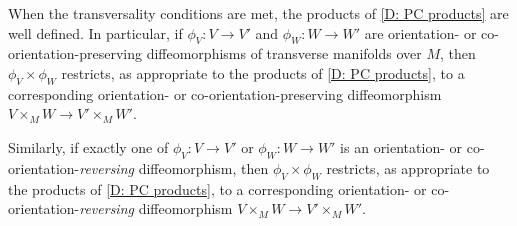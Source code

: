 \begin{lemma}\label{L: product preserves iso}
	When the transversality conditions are met, the products of \cref{D: PC products} are well defined.
	In particular, if $\phi_V \colon V \to V'$ and $\phi_W \colon W \to W'$ are orientation- or co-orientation-preserving diffeomorphisms of transverse manifolds over $M$, then $\phi_V \times \phi_W$ restricts, as appropriate to the products of \cref{D: PC products}, to a corresponding orientation- or co-orientation-preserving diffeomorphism $V \times_M W \to V' \times_M W'$.

	Similarly, if exactly one of $\phi_V \colon V \to V'$ or $\phi_W \colon W \to W'$ is an orientation- or co-orientation-\textit{reversing} diffeomorphism, then $\phi_V \times \phi_W$ restricts, as appropriate to the products of \cref{D: PC products}, to a corresponding orientation- or co-orientation-\textit{reversing} diffeomorphism $V \times_M W \to V' \times_M W'$.
\end{lemma}
